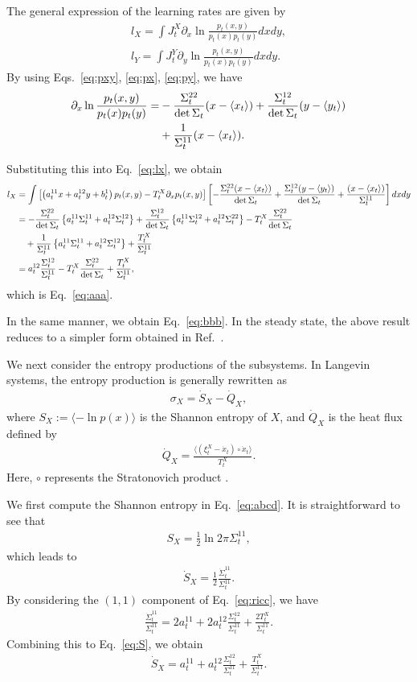 \documentclass[%
 reprint,
 amsmath,amssymb,
 aps,
]{revtex4-1}
\newcommand{\balign}[1]{\begin{align} #1 \end{align}}
\newcommand{\average}[1]{\ensuremath{\langle#1\rangle} }
\newcommand{\eref}[1]{Eq.~\eqref{#1}}
\newcommand{\del}{\partial}
\theoremstyle{plain}
\begin{document}
The general expression of the learning rates are given by~\cite{Horowitz2014,Rosinberg2016}
\balign{
l_{X}=\int J^X_t\del_x\ln \frac{p_t(x,y)}{p_t(x)p_t(y)}dxdy, \label{eq:lx} \\
l_{Y}=\int J^Y_t\del_y\ln \frac{p_t(x,y)}{p_t(x)p_t(y)}dxdy.
}
By using Eqs.~\eqref{eq:pxy}, \eqref{eq:px}, \eqref{eq:py}, we have
\balign{
\del_x\ln \frac{p_t(x,y)}{p_t(x)p_t(y)}=&-\frac{\Sigma_t^{22}}{\det\Sigma_t}(x-\average{x_t})+\frac{\Sigma_t^{12}}{\det\Sigma_t}(y-\average{y_t}) \notag \\
&+\frac{1}{\Sigma_t^{11}}(x-\average{x_t}).
}
\begin{widetext}
Substituting this into \eref{eq:lx}, we obtain
\balign{
l_{X}&=\int \left[\left(a_t^{11}x+a_t^{12}y+b^1_t\right)p_t(x,y)-T^X_t\del_x p_t(x,y)\right]\left[-\frac{\Sigma_t^{22}(x-\average{x_t})}{\det\Sigma_t}+\frac{\Sigma_t^{12}(y-\average{y_t})}{\det\Sigma_t}+\frac{(x-\average{x_t})}{\Sigma_t^{11}}\right]dxdy \notag \\
&=-\frac{\Sigma_t^{22}}{\det\Sigma_t}\left\{ a_t^{11}\Sigma_t^{11}+a_t^{12}\Sigma_t^{12} \right\}+\frac{\Sigma_t^{12}}{\det\Sigma_t}\left\{ a_t^{11}\Sigma_t^{12}+a_t^{12}\Sigma_t^{22} \right\}-T_t^X\frac{\Sigma_t^{22}}{\det\Sigma_t} \notag \\
&\ \ \ +\frac{1}{\Sigma_t^{11}}\left\{ a_t^{11}\Sigma_t^{11}+a_t^{12}\Sigma_t^{12} \right\}+\frac{T_t^X}{\Sigma_t^{11}} \notag \\
&=a_t^{12}\frac{\Sigma^{12}_t}{\Sigma^{11}_t}-T_t^X\frac{\Sigma_t^{22}}{\det\Sigma_t}+\frac{T_t^X}{\Sigma_t^{11}}, \label{eq:lxt}
}
which is \eref{eq:aaa}.
\end{widetext}
In the same manner, we obtain \eref{eq:bbb}. In the steady state, the above result reduces to a simpler form obtained in Ref.~\cite{Horowitz2014}.

We next consider the entropy productions of the subsystems. In Langevin systems, the entropy production is generally rewritten as \cite{Sekimoto}
\balign{
\sigma_{X}=\dot{S}_{X}-\dot{Q}_{X}, \label{eq:abcd}
}
where $S_{X}:=\langle -\ln p(x)\rangle$ is the Shannon entropy of $X$, and $\dot{Q}_{X}$ is the heat flux defined by
\balign{
\dot{Q}_{X}=\frac{\average{(\xi_t^X-\dot{x}_t)\circ \dot{x}_t}}{T^X_t}. \label{eq:abcd2}
}
Here, $\circ$ represents the Stratonovich product \cite{Gardiner}.

We first compute the Shannon entropy in \eref{eq:abcd}. It is straightforward to see that
\balign{
S_{X}=\frac{1}{2}\ln 2\pi \Sigma_t^{11}, \label{eq:S}
}
which leads to
\balign{
\dot{S}_{X}=\frac{1}{2}\frac{\dot{\Sigma}^{11}_t}{\Sigma^{11}_t}.
}
By considering the $(1,1)$ component of \eref{eq:ricc}, we have
\balign{
\frac{\dot{\Sigma}^{11}_t}{\Sigma^{11}_t}=2a_t^{11}+2a^{12}_t\frac{\Sigma^{12}_t}{\Sigma^{11}_t}+\frac{2T_t^X}{\Sigma^{11}_t}.
}
Combining this to \eref{eq:S}, we obtain 
\balign{
\dot{S}_{X}=a^{11}_t+a_t^{12}\frac{\Sigma^{12}_t}{\Sigma^{11}_t}+\frac{T^X_t}{\Sigma^{11}_t}. \label{eq:Sdot}
}
\end{document}
